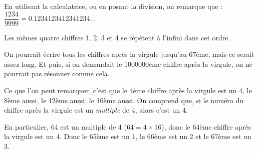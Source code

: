 \documentclass[addpoints,12pt]{exam}
\begin{document}
\begin{questions}
    En utilisant la calculatrice, ou en posant la division, on remarque que :
    $\dfrac{1234}{9999} = \num{0,1234123412341234}...$

    Les mêmes quatre chiffres 1, 2, 3 et 4 se répètent à l'infini dans cet ordre.

    On pourrait écrire tous les chiffres après la virgule jusqu'au 67ème, mais ce serait assez long. Et puis, si on demandait le \num{1000000}ème chiffre après la virgule, on ne pourrait pas résonner comme cela.

    Ce que l'on peut remarquer, c'est que le 4ème chiffre après la virgule est un 4, le 8ème aussi, le 12ème aussi, le 16ème aussi. On comprend que, si le numéro du chiffre après la virgule est un \emph{multiple} de 4, alors c'est un 4.

    En particulier, 64 est un multiple de 4 ($64 = 4 \times 16$), donc le 64ème chiffre après la virgule est un 4. Donc le 65ème est un 1, le 66ème est un 2 et le 67ème est un 3.
\end{questions}
\end{document}
